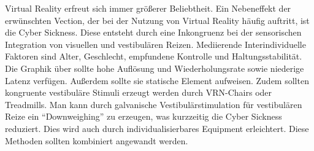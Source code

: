 Virtual Reality erfreut sich immer gr\"o{\ss}erer Beliebtheit. Ein  Nebeneffekt der erw\"unschten Vection, der bei der Nutzung von Virtual Reality h\"aufig auftritt, ist die Cyber Sickness.
Diese entsteht durch eine Inkongruenz bei der sensorischen Integration von visuellen und vestibul\"aren Reizen.
Mediierende Interindividuelle Faktoren sind Alter, Geschlecht, empfundene Kontrolle und Haltungsstabilit\"at.
Die Graphik \"uber sollte hohe Aufl\"osung und Wiederholungsrate sowie niederige Latenz verf\"ugen. Außerdem sollte sie statische Element aufweisen. Zudem sollten kongruente vestibul\"are Stimuli erzeugt werden durch VRN-Chairs oder Treadmills. Man kann durch galvanische Vestibul\"arstimulation für vestibul\"aren Reize ein "`Downweighing"' zu erzeugen, was kurzzeitig die Cyber Sickness reduziert. Dies wird auch durch individualisierbares Equipment erleichtert. Diese Methoden sollten kombiniert angewandt werden.




